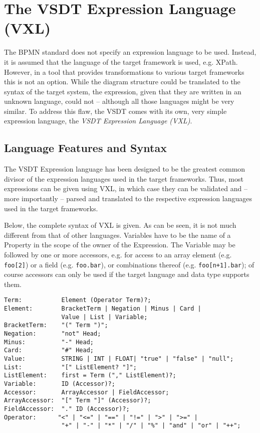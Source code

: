 \chapter{The VSDT Expression Language (VXL)}
\label{sec:vxl}

The BPMN standard does not specify an expression language to be used.  Instead,
it is assumed that the language of the target framework is used, e.g.  XPath.
However, in a tool that provides transformations to various target frameworks
this is not an option.  While the diagram structure could be translated to the
syntax of the target system, the expression, given that they are written in an
unknown language, could not -- although all those languages might be very similar.
To address this flaw, the VSDT comes with its own, very simple expression language,
the \emph{VSDT Expression Language (VXL)}.



\section{Language Features and Syntax}

The VSDT Expression language has been designed to be the greatest common divisor
of the expression languages used in the target frameworks.  Thus, most expressions
can be given using VXL, in which case they can be validated and -- more importantly
-- parsed and translated to the respective expression languages used in the target
frameworks.

Below, the complete syntax of VXL is given.  As can be seen, it is not much
different from that of other languages.  Variables have to be the name of a
Property in the scope of the owner of the Expression.  The Variable may be followed
by one or more accessors, e.g. for access to an array element (e.g. \verb|foo[2]|)
or a field (e.g. \verb|foo.bar|), or combinations thereof (e.g. \verb|foo[n+1].bar|);
of course accessors can only be used if the target language and data type supports
them.

\begin{verbatim}
Term:           Element (Operator Term)?;
Element:        BracketTerm | Negation | Minus | Card |
                Value | List | Variable;
BracketTerm:    "(" Term ")";
Negation:       "not" Head;
Minus:          "-" Head;
Card:           "#" Head;
Value:          STRING | INT | FLOAT| "true" | "false" | "null";
List:           "[" ListElement? "]";
ListElement:    first = Term ("," ListElement)?;
Variable:       ID (Accessor)?;
Accessor:       ArrayAccessor | FieldAccessor;
ArrayAccessor:  "[" Term "]" (Accessor)?;
FieldAccessor:  "." ID (Accessor)?;
Operator:      "<" | "<=" | "==" | "!=" | ">" | ">=" | 
                "+" | "-" | "*" | "/" | "%" | "and" | "or" | "++";
\end{verbatim}


